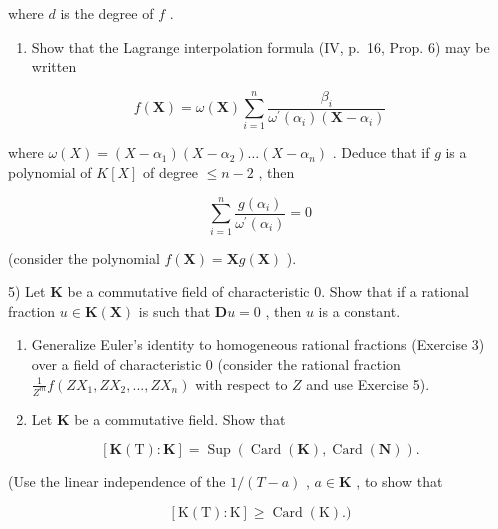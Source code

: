 where \(d\) is the degree of \(f\) .

\begin{enumerate}
\def\labelenumi{\arabic{enumi})}
\setcounter{enumi}{3}
\tightlist
\item
  Show that the Lagrange interpolation formula (IV, p.~16, Prop. 6) may be written
\end{enumerate}

\[
f (\mathbf {X}) = \omega (\mathbf {X}) \sum_ {i = 1} ^ {n} \frac {\beta_ {i}}{\omega^ {\prime} (\alpha_ {i}) (\mathbf {X} - \alpha_ {i})}
\]

where \(\omega(X) = (X - \alpha_1)(X - \alpha_2) \ldots (X - \alpha_n)\) . Deduce that if \(g\) is a polynomial of \(K[X]\) of degree \(\leqslant n - 2\) , then

\[
\sum_ {i = 1} ^ {n} \frac {g (\alpha_ {i})}{\omega^ {\prime} (\alpha_ {i})} = 0
\]

(consider the polynomial \(f(\mathbf{X}) = \mathbf{X}g(\mathbf{X})\) ).

5) Let \(\mathbf{K}\) be a commutative field of characteristic 0. Show that if a rational fraction \(u \in \mathbf{K}(\mathbf{X})\) is such that \(\mathbf{D}u = 0\) , then \(u\) is a constant.

\begin{enumerate}
\def\labelenumi{\arabic{enumi})}
\setcounter{enumi}{5}
\item
  Generalize Euler's identity to homogeneous rational fractions (Exercise 3) over a field of characteristic 0 (consider the rational fraction \(\frac{1}{Z^m} f(ZX_1, ZX_2, ..., ZX_n)\) with respect to \(Z\) and use Exercise 5).
\item
  Let \(\mathbf{K}\) be a commutative field. Show that
\end{enumerate}

\[
[ \mathbf {K} (\mathrm{T}): \mathbf {K} ] = \operatorname{Sup} (\operatorname{Card} (\mathbf {K}), \operatorname{Card} (\mathbf {N})).
\]

(Use the linear independence of the \(1 / (T - a)\) , \(a \in \mathbf{K}\) , to show that

\[
[ \mathrm{K} (\mathrm{T}): \mathrm{K} ] \geqslant \operatorname{Card} (\mathrm{K}).)
\]
\relax{}
